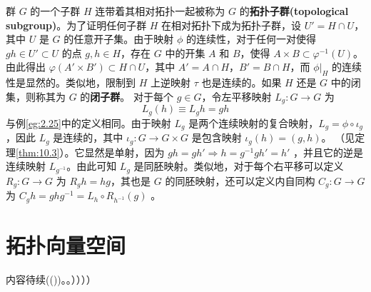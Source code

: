 	群 $G$ 的一个子群 $H$ 连带着其相对拓扑一起被称为 $G$ 的\textbf{拓扑子群(topological subgroup)}。为了证明任何子群 $H$ 在相对拓扑下成为拓扑子群，设 $U'=H\cap U$，其中 $U$ 是 $G$ 的任意开子集。由于映射 $\phi $ 的连续性，对于任何一对使得 $gh\in U'\subset U$ 的点 $g,h\in H$，存在 $G$ 中的开集 $A$ 和 $B$，使得 $A\times B\subset \varphi ^{-1} (U)$。由此得出 $\varphi (A'\times B')\subset H\cap U$，其中 $A'=A\cap H$，$B'=B\cap H$，而 $ \phi |_{H}$ 的连续性是显然的。类似地，限制到 $H$ 上逆映射 $\tau $ 也是连续的。如果 $H$ 还是 $G$ 中的闭集，则称其为 $G$ 的\textbf{闭子群}。
	对于每个 $g\in G$，令左平移映射 $L_{g} :G\rightarrow G$ 为
\begin{equation*}
L_{g} (h)\equiv L_{g} h=gh
\end{equation*}
与例\ref{eg:2.25}中的定义相同。由于映射 $L_{g}$ 是两个连续映射的复合映射，$L_{g} =\phi \circ \iota _{g}$，因此 $L_{g}$ 是连续的，其中 $\iota _{g} :G\rightarrow G\times G$ 是包含映射 $\iota _{g} (h)=(g,h)$。
（见定理\ref{thm:10.3}）。它显然是单射，因为 $gh=gh'\Longrightarrow h=g^{-1} gh'=h'$ ，并且它的逆是连续映射 $L_{g^{-1}}$。由此可知 $L_{g}$ 是同胚映射。类似地，对于每个右平移可以定义 $R_{g} :G\rightarrow G$ 为 $R_{g} h=hg$，其也是 $G$ 的同胚映射，还可以定义内自同构 $C_{g} :G\rightarrow G$ 为 $C_{g} h=ghg^{-1} =L_{h} \circ R_{h^{-1}}( g)$ 。
\section{拓扑向量空间}
内容待续(())。。））））